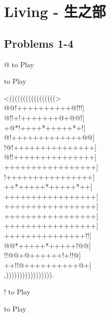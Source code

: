 \documentclass[mcrownvopaper,10pt,onecolumn,final]{memoir}
\begin{document}
\chapter{Living - 生之部}

\section{Problems 1-4}
\begin{minipage}[c]{0.5\linewidth}
    \hspace{8.3mm} {\gnos%
        @
    }
    to Play
\end{minipage}
\begin{minipage}[c]{0.5\linewidth}
    \hspace{27mm}{\gnos%
        !
    }
    to Play
\end{minipage}
\begin{minipage}[c]{\linewidth}
    \centering
    {\gnos%
    <(((((((((((((((((>\\
    @@!++++++++++@!!!]\\
    @!!+!+++++++@+@@!]\\
    +@*!++++*+++++*+!]\\
    @!+++++++++++++@@]\\
    !@!+++++++++++++++]\\
    @!!+++++++++++++++]\\
    +++++++++++++++++]\\
    !++++++++++++++++]\\
    ++*+++++*+++++*++]\\
    +++++++++++++++++]\\
    +++++++++++++++++]\\
    +++++++++++++++++]\\
    +++++++++++++++++]\\
    +++++++++++++++!!]\\
    @@*+++++*+++++!@@]\\
    !!@@+@++++++!+!!@]\\
    ++!!@++++++++++@+]\\
    ,))))))))))))))))).\\
    }
\end{minipage}
\begin{minipage}[c]{0.5\linewidth}
    \hspace{8mm} {\gnos%
        !
    }
    to Play
\end{minipage}
\begin{minipage}[c]{0.5\linewidth}
    \hspace{27mm}{\gnos%
        @
    }
    to Play
\end{minipage}
\newpage
\end{document}
